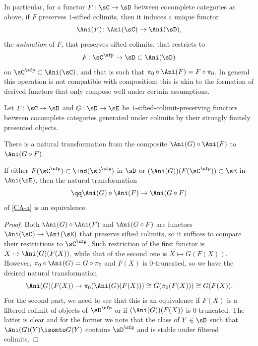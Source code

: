 In particular, for a functor $F: \sC\to \sD$ between cocomplete categories as above, if $F$ preserves $1$-sifted colimits, then it induces a unique functor
\[
\Ani(F)\colon \Ani(\sC)\to \Ani(\sD),
\]
the \emph{animation} of $F$, that preserves sifted colimits, that restricts to
\[
F\colon \sC^\sfp\to \sD\subset \Ani(\sD)
\]
on $\sC^\sfp\subset \Ani(\sC)$, and that is such that $\pi_0\circ \Ani(F) = F \circ \pi_0$. In general this operation is not compatible with composition; this is akin to the formation of derived functors that only compose well under certain assumptions.
\epp

\begin{proposition}
\notready\label{prop:composeanimation}
Let $F\colon \sC\to \sD$ and $G\colon \sD\to \sE$ be $1$-sifted-colimit-preserving functors between cocomplete categories generated under colimits by their strongly finitely presented objects.
\benum
\item {}
There is a natural transformation from the composite $\Ani(G)\circ \Ani(F)$ to $\Ani(G\circ F)$.

\item {}
If either $F(\sC^\sfp) \subset \Ind(\sD^\sfp)$ in $\sD$ or  $(\Ani(G))(F(\sC^\sfp)) \subset \sE$ in $\Ani(\sE)$, then the natural transformation
\[
\qq \Ani(G)\circ \Ani(F)\to \Ani(G\circ F)
\]
of \ref{CA-a} is an equivalence.
\eenum
\end{proposition}


\begin{proof}
Both $\Ani(G) \circ \Ani(F)$ and $\Ani(G \circ F)$ are  functors $\Ani(\sC)\to \Ani(\sE)$ that preserve sifted colimits, so it suffices to compare their restrictions to $\sC^\sfp$. Such restriction of the first functor is $X\mapsto \Ani(G)(F(X))$, while that of the second one is $X\mapsto G(F(X))$. However, $\pi_0 \circ \Ani(G) = G\circ \pi_0$ and $F(X)$ is $0$-truncated, so we have the desired natural transformation
\[
\Ani(G)(F(X))\to \pi_0 (\Ani(G)(F(X))) \cong G(\pi_0 (F(X))) \cong G(F(X)).
\]
For the second part, we need to see that this is an equivalence if $F(X)$ is a filtered colimit of objects of $\sD^\sfp$ or if $(\Ani(G))(F(X))$ is $0$-truncated. The latter is clear and for the former we note that the class of $Y \in \sD$ such that $\Ani(G)(Y)\isomto G(Y)$ contains $\sD^\sfp$ and is stable under filtered colimits.
\end{proof}



